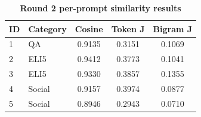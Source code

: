 \begin{table}[htbp]
\centering
\caption{\textbf{Round 2 per-prompt similarity results}}
\label{tab:round2-similarity-per-prompt}
\renewcommand{\arraystretch}{1.4}
\begin{tabular}{|l|l|c|c|c|}
\hline
\textbf{ID} & \textbf{Category} & \textbf{Cosine} & \textbf{Token J} & \textbf{Bigram J} \\
\hline
1 & QA & 0.9135 & 0.3151 & 0.1069 \\
\hline
2 & ELI5 & 0.9412 & 0.3773 & 0.1041 \\
\hline
3 & ELI5 & 0.9330 & 0.3857 & 0.1355 \\
\hline
4 & Social & 0.9157 & 0.3974 & 0.0877 \\
\hline
5 & Social & 0.8946 & 0.2943 & 0.0710 \\
\hline
\end{tabular}
\end{table}
